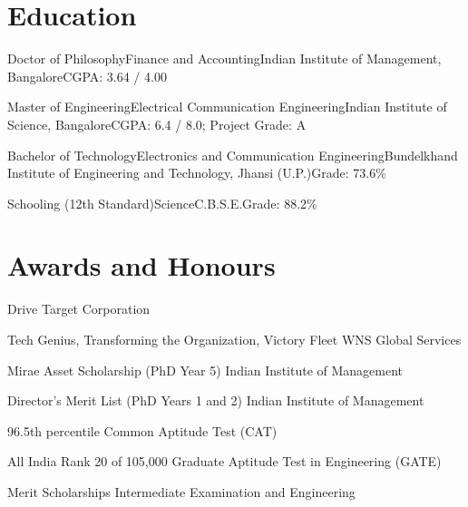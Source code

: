 \documentclass[11pt,a4paper]{moderncv}
\begin{document}
\hypertarget{education}{
\section{Education}\label{education}}

\nopagebreak
    {Doctor of Philosophy}{Finance and Accounting}{Indian Institute of Management, Bangalore}{}{CGPA: 3.64 / 4.00}

    {Master of Engineering}{Electrical Communication Engineering}{Indian Institute of Science, Bangalore}{}{CGPA: 6.4 / 8.0; Project Grade: A}

    {Bachelor of Technology}{Electronics and Communication Engineering}{Bundelkhand Institute of Engineering and Technology, Jhansi (U.P.)}{}{Grade: 73.6\%}

    {Schooling (12th Standard)}{Science}{C.B.S.E.}{}{Grade: 88.2\%}

\hypertarget{awards-and-honours}{
\section{Awards and Honours}\label{awards-and-honours}}

\nopagebreak
    {Drive}
    {Target Corporation}{}{}{}

    {Tech Genius, Transforming the Organization, Victory Fleet}
    {WNS Global Services}{}{}{}

    {Mirae Asset Scholarship (PhD Year 5)}
    {Indian Institute of Management}{}{}{}

    {Director's Merit List (PhD Years 1 and 2)}
    {Indian Institute of Management}{}{}{}

    {96.5th percentile}
    {Common Aptitude Test (CAT)}{}{}{}

    {All India Rank 20 of 105,000}
    {Graduate Aptitude Test in Engineering (GATE)}{}{}{}

    {Merit Scholarships}
    {Intermediate Examination and Engineering}{}{}{}
\end{document}
